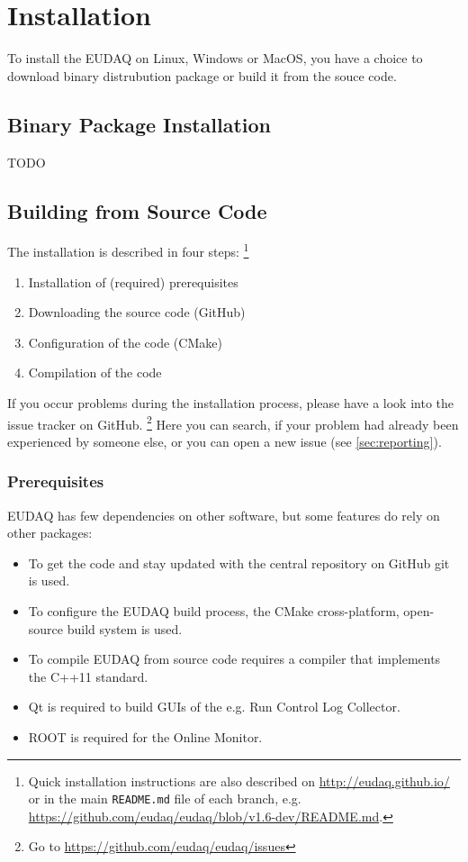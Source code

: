 \section{Installation}
To install the EUDAQ on Linux, Windows or MacOS, you have a choice to download binary distrubution package or build it from the souce code.

\subsection{Binary Package Installation}
TODO


\subsection{Building from Source Code}

The installation is described in four steps:%
\footnote{Quick installation instructions are also described on \url{http://eudaq.github.io/} or in the main \texttt{README.md} file of each branch, e.g. \url{https://github.com/eudaq/eudaq/blob/v1.6-dev/README.md}.}
\begin{enumerate}
\item Installation of (required) prerequisites
\item Downloading the source code (GitHub)
\item Configuration of the code (CMake)
\item Compilation of the code
\end{enumerate}

If you occur problems during the installation process, please have a look into the issue tracker on GitHub.%
\footnote{Go to \url{https://github.com/eudaq/eudaq/issues}} 
Here you can search, if your problem had already been experienced by someone else, or you can open a new issue (see \autoref{sec:reporting}).

\subsubsection{Prerequisites}

EUDAQ has few dependencies on other software, but some features do rely on other packages:
\begin{itemize}
\item To get the code and stay updated with the central repository on GitHub git is used.
\item To configure the EUDAQ build process, the CMake cross-platform, open-source build system is used.
\item To compile EUDAQ from source code requires a compiler that implements the C++11 standard.
\item Qt is required to build GUIs of the e.g. Run Control Log Collector. 
\item ROOT is required for the Online Monitor.
\end{itemize}

